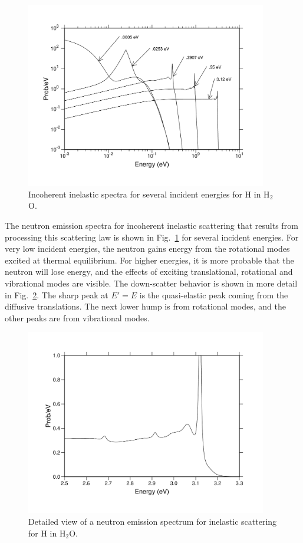 \begin{figure}[b]\centering
\includegraphics[keepaspectratio, height=3.2in, angle=0]{figs/hh2o-specack}
\caption[Incoherent inelastic spectra for H in H$_2$O]{Incoherent inelastic
 spectra for several incident energies for H in H$_2$O.}
\label{hh2o-spec}
\end{figure}

The neutron emission spectra for incoherent inelastic scattering that
results from processing this scattering law is shown in Fig.~\ref{hh2o-spec}
for several incident energies. For very low incident energies, the neutron
gains energy from the rotational modes excited at thermal equilibrium.
For higher energies, it is more probable that the neutron will lose
energy, and the effects of exciting translational, rotational and
vibrational modes are visible. The down-scatter behavior is shown
in more detail in Fig.~\ref{hh2o-spec2}.  The sharp peak at $E'=E$ is the
quasi-elastic peak coming from the diffusive translations.  The next
lower hump is from rotational modes, and the other peaks are from
vibrational modes.

\begin{figure}[t]\centering
\includegraphics[keepaspectratio, height=3.2in, angle=0]{figs/hh2o-spec2ack}
\caption[Incoherent inelastic spectra for H in H$_2$O, detailed view]{Detailed
 view of a neutron emission spectrum for inelastic scattering for H in H$_2$O.}
\label{hh2o-spec2}
\end{figure}

